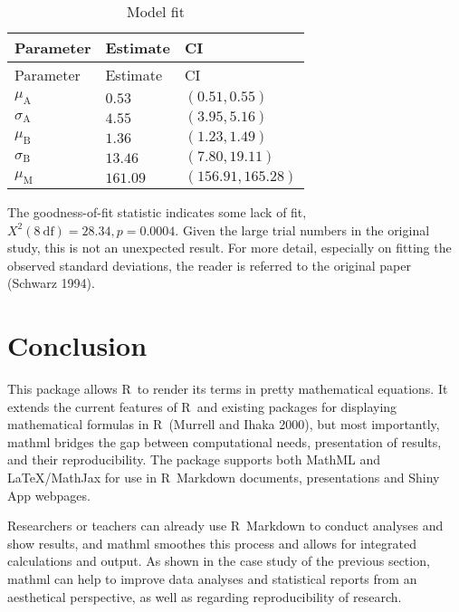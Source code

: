 \hypertarget{tab:params}{}
\begin{longtable}[]{@{}lll@{}}
\caption{Model fit}\tabularnewline
\toprule\noalign{}
Parameter & Estimate & CI \\
\midrule\noalign{}
\endfirsthead
\toprule\noalign{}
Parameter & Estimate & CI \\
\midrule\noalign{}
\endhead
\bottomrule\noalign{}
\endlastfoot
\({\mu}_{\mathrm{A}}\) & \(0.53\) & \(\left({0.51}{{,}{0.55}}\right)\) \\
\({\sigma}_{\mathrm{A}}\) & \(4.55\) & \(\left({3.95}{{,}{5.16}}\right)\) \\
\({\mu}_{\mathrm{B}}\) & \(1.36\) & \(\left({1.23}{{,}{1.49}}\right)\) \\
\({\sigma}_{\mathrm{B}}\) & \(13.46\) & \(\left({7.80}{{,}{19.11}}\right)\) \\
\({\mu}_{\mathrm{M}}\) & \(161.09\) & \(\left({156.91}{{,}{165.28}}\right)\) \\
\end{longtable}

The goodness-of-fit statistic indicates some lack of fit,
\(X^2(8\ \mathrm{df}) = 28.34, p = 0.0004\). Given the large trial
numbers in the original study, this is not an unexpected result. For
more detail, especially on fitting the observed standard deviations, the
reader is referred to the original paper (Schwarz 1994).

\hypertarget{conclusion}{%
\section{Conclusion}\label{conclusion}}

This package allows R~to render its terms in pretty mathematical
equations. It extends the current features of R~and existing packages
for displaying mathematical formulas in R~(Murrell and Ihaka 2000), but
most importantly, mathml bridges the gap between computational needs,
presentation of results, and their reproducibility. The package supports
both MathML and LaTeX/MathJax for use in R~Markdown documents,
presentations and Shiny App webpages.

Researchers or teachers can already use R~Markdown to conduct analyses
and show results, and mathml smoothes this process and allows for
integrated calculations and output. As shown in the case study of the
previous section, mathml can help to improve data analyses and
statistical reports from an aesthetical perspective, as well as
regarding reproducibility of research.

